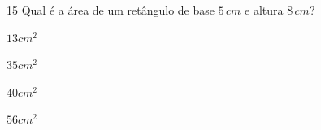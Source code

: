 

\num{15} Qual é a área de um retângulo de base $5\,cm$ e altura $8\,cm$?

\begin{escolha}
\item
  $13cm^2$
\item
  $35cm^2$
\item
  $40cm^2$
\item
  $56cm^2$
\end{escolha}


